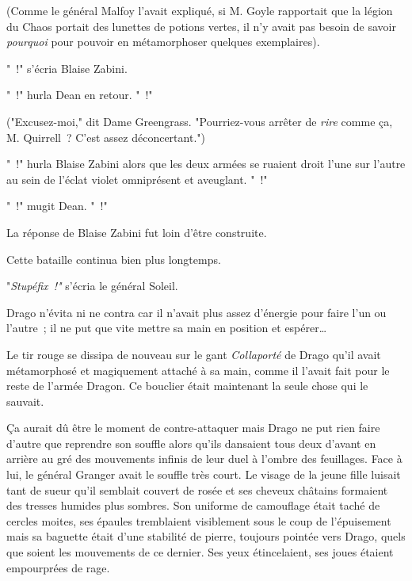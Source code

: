 (Comme le général Malfoy l'avait expliqué, si M. Goyle rapportait que la légion du Chaos portait des lunettes de potions vertes, il n'y avait pas besoin de savoir \emph{pourquoi} pour pouvoir en métamorphoser quelques exemplaires).

"~!" s'écria Blaise Zabini.

"~!" hurla Dean en retour. "~!"

("Excusez-moi," dit Dame Greengrass. "Pourriez-vous arrêter de \emph{rire} comme ça, M. Quirrell~? C'est assez déconcertant.")

"~!" hurla Blaise Zabini alors que les deux armées se ruaient droit l'une sur l'autre au sein de l'éclat violet omniprésent et aveuglant. "~!"

"~!" mugit Dean. "~!"

La réponse de Blaise Zabini fut loin d'être construite.

Cette bataille continua bien plus longtemps.

\later

"\emph{Stupéfix~!"} s'écria le général Soleil.

Drago n'évita ni ne contra car il n'avait plus assez d'énergie pour faire l'un ou l'autre~; il ne put que vite mettre sa main en position et espérer…

Le tir rouge se dissipa de nouveau sur le gant \emph{Collaporté} de Drago qu'il avait métamorphosé et magiquement attaché à sa main, comme il l'avait fait pour le reste de l'armée Dragon. Ce bouclier était maintenant la seule chose qui le sauvait.

Ça aurait dû être le moment de contre-attaquer mais Drago ne put rien faire d'autre que reprendre son souffle alors qu'ils dansaient tous deux d'avant en arrière au gré des mouvements infinis de leur duel à l'ombre des feuillages. Face à lui, le général Granger avait le souffle très court. Le visage de la jeune fille luisait tant de sueur qu'il semblait couvert de rosée et ses cheveux châtains formaient des tresses humides plus sombres. Son uniforme de camouflage était taché de cercles moites, ses épaules tremblaient visiblement sous le coup de l'épuisement mais sa baguette était d'une stabilité de pierre, toujours pointée vers Drago, quels que soient les mouvements de ce dernier. Ses yeux étincelaient, ses joues étaient empourprées de rage.


